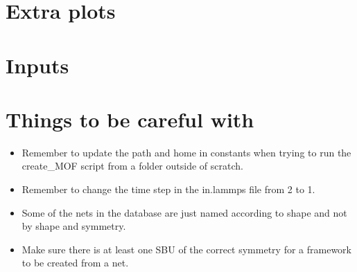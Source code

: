 \documentclass[11pt,letterpaper]{report}
\begin{document}
	\chapter{Extra plots}
	
	\chapter{Inputs}
	
	\chapter{Things to be careful with}
	\begin{itemize}
		\item Remember to update the path and home in constants when trying to run the create\_MOF script from a folder outside of scratch.
		
		\item Remember to change the time step in the in.lammps file from 2 to 1.
		
		\item Some of the nets in the database are just named according to shape and not by shape and symmetry. 
		
		\item Make sure there is at least one SBU of the correct symmetry for a framework to be created from a net. 
	\end{itemize}
	
	
	
	
	
	
\end{document}
